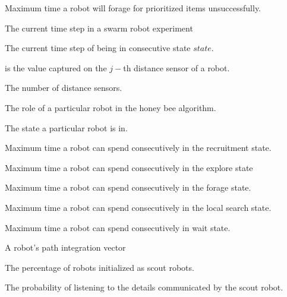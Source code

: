 \begin{description}
\setlength{\itemsep}{-1mm}

	
	\item[\parbox{\namewidth}{$f_{max}$}] Maximum time a robot will forage for prioritized items unsuccessfully.

	\item[\parbox{\namewidth}{$i$}] The current time step in a swarm robot experiment

	\item[\parbox{\namewidth}{$i_{state}$}] The current time step of being in consecutive state $state$.

	\item[\parbox{\namewidth}{$k_j$}] is the value captured on the $j-$th distance sensor of a robot.
	
	\item[\parbox{\namewidth}{$n$}] The number of distance sensors.
	
	\item[\parbox{\namewidth}{$role$}] The role of a particular robot in the honey bee algorithm.
	
	\item[\parbox{\namewidth}{$state$}] The state a particular robot is in.


	\item[\parbox{\namewidth}{$t_{dance}$}] Maximum time a robot can spend consecutively in the recruitment state.

	
	\item[\parbox{\namewidth}{$t_{explore}$}] Maximum time a robot can spend consecutively in the explore state

	\item[\parbox{\namewidth}{$t_{forage}$}] Maximum time a robot can spend consecutively in the forage state.
	
	\item[\parbox{\namewidth}{$t_{ls}$}] Maximum time a robot can spend consecutively in the local search state.
		
	
	\item[\parbox{\namewidth}{$t_{wait}$}] Maximum time a robot can spend consecutively in wait state.
	
	\item[\parbox{\namewidth}{$v$}] A robot's path integration vector
	

	\item[\parbox{\namewidth}{$X$}] The percentage of robots initialized as scout robots.

	
	\item[\parbox{\namewidth}{$\alpha$}] The probability of listening to the details communicated by the scout robot.	



\end{description}

